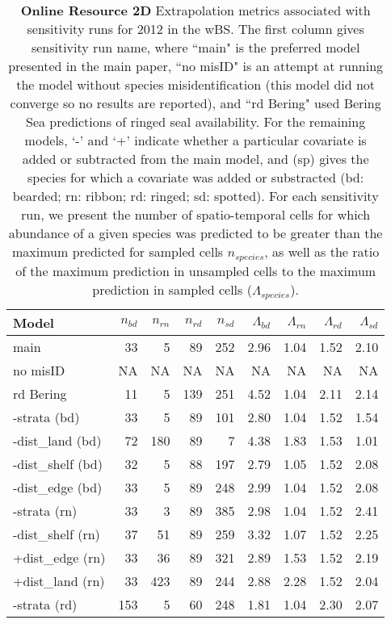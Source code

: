 \documentclass{svjour3}
\begin{document}
\begin{table}[htbp]
\centering
\caption{\textbf{Online Resource 2D} Extrapolation metrics associated with sensitivity runs for 2012 in the wBS. The first column gives sensitivity run name, where ``main" is the preferred model presented in the main paper, ``no misID" is an attempt at running the model without species misidentification (this model did not converge so no results are reported), and ``rd Bering" used Bering Sea predictions of ringed seal availability.  For the remaining models, `-' and `+' indicate whether a particular covariate is added or subtracted from the main model, and (sp) gives the species for which a covariate was added or substracted (bd: bearded; rn: ribbon; rd: ringed; sd: spotted).  For each sensitivity run, we present the number of spatio-temporal cells for which abundance of a given species was predicted to be greater than the maximum predicted for sampled cells $n_{species}$, as well as the ratio of the maximum prediction in unsampled cells to the maximum prediction in sampled cells ($\Lambda_{species}$). }
\begin{tabular}{lrrrrrrrr}
  \hline
Model & $n_{bd}$ & $n_{rn}$ & $n_{rd}$ & $n_{sd}$ & $\Lambda_{bd}$ & $\Lambda_{rn}$ & $\Lambda_{rd}$ & $\Lambda_{sd}$ \\
  \hline
main & 33 & 5 & 89 & 252 & 2.96 & 1.04 & 1.52 & 2.10 \\
  no misID & NA & NA & NA & NA & NA & NA  & NA & NA \\
  rd Bering & 11 & 5 & 139 & 251 & 4.52 & 1.04 & 2.11 & 2.14 \\
  -strata (bd) & 33 & 5 & 89 & 101 & 2.80 & 1.04 & 1.52 & 1.54 \\
  -dist\_land (bd) & 72 & 180 & 89 & 7 & 4.38 & 1.83 & 1.53 & 1.01 \\
  -dist\_shelf (bd) & 32 & 5 & 88 & 197 & 2.79 & 1.05 & 1.52 & 2.08 \\
  -dist\_edge (bd) & 33 & 5 & 89 & 248 & 2.99 & 1.04 & 1.52 & 2.08 \\
  -strata (rn) & 33 & 3 & 89 & 385 & 2.98 & 1.04 & 1.52 & 2.41 \\
  -dist\_shelf (rn) & 37 & 51 & 89 & 259 & 3.32 & 1.07 & 1.52 & 2.25 \\
  +dist\_edge (rn) & 33 & 36 & 89 & 321 & 2.89 & 1.53 & 1.52 & 2.19 \\
  +dist\_land (rn) & 33 & 423 & 89 & 244 & 2.88 & 2.28 & 1.52 & 2.04 \\
  -strata (rd) & 153 & 5 & 60 & 248 & 1.81 & 1.04 & 2.30 & 2.07 \\

\end{tabular}
\end{table}
\end{document}
